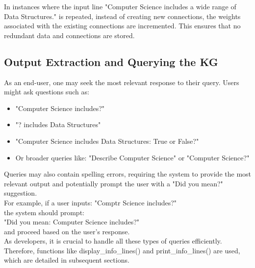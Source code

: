 \documentclass[conference]{IEEEtran}
\begin{document}


In instances where the input line "Computer Science includes a wide range of Data Structures." is 
repeated, instead of creating new connections, the weights associated with the existing connections 
are incremented. This ensures that no redundant data and connections are stored.


\subsection{\textbf{Output Extraction and Querying the KG}}

As an end-user, one may seek the most relevant response to their query. Users might ask questions such as:
\begin{itemize}
    \item "Computer Science includes?"
    \item "? includes Data Structures"
    \item "Computer Science includes Data Structures: True or False?"
    \item Or broader queries like: "Describe Computer Science" or "Computer Science?"
\end{itemize}

Queries may also contain spelling errors, requiring the system to provide the most relevant output and potentially prompt the user with a "Did you mean?" suggestion.
\\
For example, if a user inputs: "Comptr Science includes?" 
\\the system should prompt:
\\
"Did you mean: Computer Science includes?" 
\\
and proceed based on the user's response.
\\

As developers, it is crucial to handle all these types of queries efficiently. Therefore, functions like display\_info\_lines() and print\_info\_lines() are used, which are detailed in subsequent sections.
\\
\end{document}
